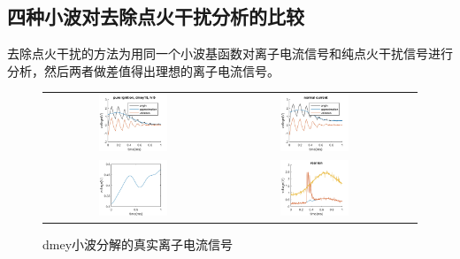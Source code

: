 \subsection{四种小波对去除点火干扰分析的比较}
去除点火干扰的方法为用同一个小波基函数对离子电流信号和纯点火干扰信号进行分析，然后两者做差值得出理想的离子电流信号。
\begin{figure}[!ht]
	\centering
	\begin{tabular}{ccc}
		\includegraphics[width=0.4\textwidth]{thesis_figure/ion_chapter/dmey_wafig_pureign}&
		\includegraphics[width=0.4\textwidth]{thesis_figure/ion_chapter/dmey_icfig_norm}\\
		\includegraphics[width=0.4\textwidth]{thesis_figure/ion_chapter/dmey_diffSign}&
		\includegraphics[width=0.4\textwidth]{thesis_figure/ion_chapter/dmey_realIonFig}
	\end{tabular}
	\caption{\label{fig:dmey_realIon}dmey小波分解的真实离子电流信号}
\end{figure}
